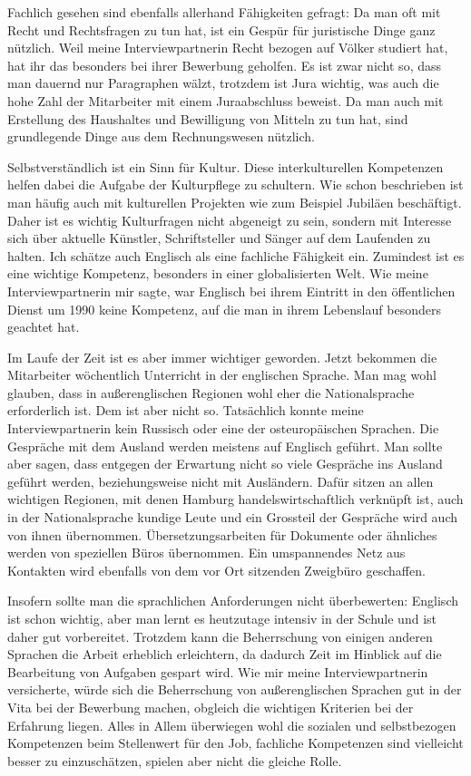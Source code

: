 \documentclass{../../sem_paper}
\begin{document}
Fachlich gesehen sind ebenfalls allerhand Fähigkeiten gefragt:
Da man oft mit Recht und Rechtsfragen zu tun hat, ist ein Gespür für juristische Dinge ganz nützlich. Weil meine Interviewpartnerin Recht bezogen auf Völker studiert hat, hat ihr das besonders bei ihrer Bewerbung geholfen. Es ist zwar nicht so, dass man dauernd nur Paragraphen wälzt, trotzdem  ist Jura wichtig, was auch die hohe Zahl der Mitarbeiter mit einem Juraabschluss beweist.
Da man auch mit Erstellung des Haushaltes und Bewilligung von Mitteln zu tun hat, sind grundlegende Dinge aus dem Rechnungswesen nützlich.

Selbstverständlich  ist ein Sinn für Kultur. Diese interkulturellen Kompetenzen helfen dabei die Aufgabe der Kulturpflege zu schultern. Wie schon beschrieben ist man häufig auch mit kulturellen Projekten wie zum Beispiel Jubiläen beschäftigt. Daher ist es wichtig Kulturfragen nicht abgeneigt zu sein, sondern mit Interesse sich über aktuelle Künstler, Schriftsteller und Sänger auf dem Laufenden zu halten.
Ich schätze auch Englisch als eine fachliche Fähigkeit ein. Zumindest ist es eine wichtige Kompetenz, besonders in einer globalisierten Welt. Wie meine Interviewpartnerin mir sagte, war Englisch bei ihrem Eintritt in den öffentlichen Dienst um 1990 keine Kompetenz, auf die man in ihrem Lebenslauf besonders geachtet hat.

Im Laufe der Zeit ist es aber immer wichtiger geworden. Jetzt bekommen die Mitarbeiter wöchentlich Unterricht in der englischen Sprache. Man mag wohl glauben, dass in außerenglischen Regionen wohl eher die Nationalsprache erforderlich ist. Dem ist aber nicht so. Tatsächlich konnte meine Interviewpartnerin kein Russisch oder eine der osteuropäischen Sprachen. Die Gespräche mit dem Ausland werden meistens auf Englisch geführt. Man sollte aber sagen, dass entgegen der Erwartung nicht so viele Gespräche ins Ausland geführt werden, beziehungsweise nicht mit Ausländern. Dafür sitzen an allen wichtigen Regionen, mit denen Hamburg handelswirtschaftlich verknüpft ist, auch in der Nationalsprache kundige Leute und ein Grossteil der Gespräche wird auch von ihnen übernommen. Übersetzungsarbeiten für Dokumente oder ähnliches werden  von speziellen Büros übernommen. Ein umspannendes Netz aus Kontakten wird ebenfalls von dem vor Ort sitzenden Zweigbüro geschaffen.

Insofern sollte man die sprachlichen Anforderungen nicht überbewerten: Englisch ist schon wichtig, aber man lernt es heutzutage intensiv in der Schule und ist daher gut vorbereitet. Trotzdem kann die Beherrschung von einigen anderen Sprachen die Arbeit erheblich erleichtern, da dadurch Zeit im Hinblick auf die Bearbeitung von Aufgaben gespart wird. Wie mir meine Interviewpartnerin versicherte, würde sich die Beherrschung von außerenglischen Sprachen gut in der Vita bei der Bewerbung machen, obgleich die wichtigen  Kriterien bei der Erfahrung liegen.
Alles in Allem überwiegen wohl die sozialen und selbstbezogen Kompetenzen beim Stellenwert für den Job, fachliche Kompetenzen sind vielleicht besser zu einzuschätzen, spielen aber nicht die gleiche Rolle.
\end{document}
